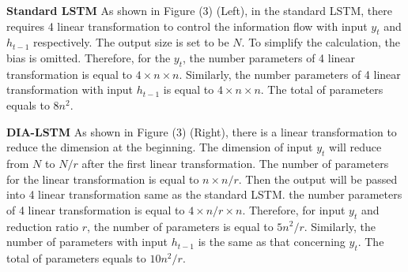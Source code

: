 \documentclass[letterpaper]{article} \usepackage{aaai20}  \usepackage{times}  \usepackage{helvet} \usepackage{courier}  \usepackage[hyphens]{url}  \usepackage{graphicx} \urlstyle{rm} \def\UrlFont{\rm}  \usepackage{graphicx}  \frenchspacing  \setlength{\pdfpagewidth}{8.5in}  \setlength{\pdfpageheight}{11in}  \usepackage{color}
\begin{document}
	\textbf{Standard LSTM}
	As shown in Figure (3) (Left), in the standard LSTM, there requires 4 linear transformation to control the information flow with input $y_t$ and $h_{t-1}$ respectively. The output size is set to be $N$. To simplify the calculation, the bias is omitted. Therefore, for the $y_t$, the number parameters of 4 linear transformation is equal to $4\times n\times n$. Similarly, the number parameters of 4 linear transformation with input $h_{t-1}$ is equal to $4\times n\times n$. The total of parameters equals to $8n^2.$
	
	\textbf{DIA-LSTM} As shown in Figure (3) (Right), there is a linear transformation to reduce the dimension at the beginning. The dimension of input $y_t$ will reduce from $N$ to $N/r$ after the first linear transformation. The number of parameters for the linear transformation is equal to $n\times n/r$. Then the output will be passed into 4 linear transformation same as the standard LSTM. the number parameters of 4 linear transformation is equal to $4\times n/r \times n$. Therefore, for input $y_t$ and reduction ratio $r$, the number of parameters is equal to $5n^2/r$. Similarly, the number of parameters with input $h_{t-1}$ is the same as that concerning $y_t$. The total of parameters equals to $10n^2/r.$
	
\end{document}
